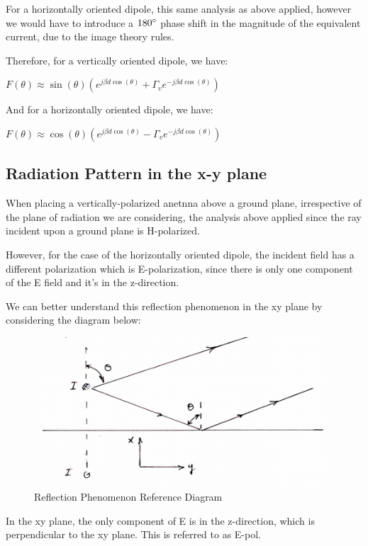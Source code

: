 \documentclass{article}
\begin{document}
For a horizontally oriented dipole, this same analysis as above applied, however we would have to introduce a $180 \degree$ phase shift in the magnitude of the equivalent current, due to the image theory rules.

Therefore, for a vertically oriented dipole, we have:

\begin{center}
    $F(\theta) \approx \sin(\theta)(e^{j\beta d \cos(\theta)} + \Gamma_v e^{-j \beta d \cos(\theta)})$
\end{center}

And for a horizontally oriented dipole, we have:

\begin{center}
    $F(\theta) \approx \cos(\theta)(e^{j\beta d \cos(\theta)} - \Gamma_v e^{-j \beta d \cos(\theta)})$
\end{center}

\subsection{Radiation Pattern in the x-y plane}

When placing a vertically-polarized anetnna above a ground plane, irrespective of the plane of radiation we are considering, the analysis above applied since the ray incident upon a ground plane is H-polarized.

However, for the case of the horizontally oriented dipole, the incident field has a different polarization which is E-polarization, since there is only one component of the E field and it's in the z-direction.

We can better understand this reflection phenomenon in the xy plane by considering the diagram below:

\begin{figure}[H]
  \centering
     \includegraphics[scale=0.45]{Course Notes/images/9.6.png}
  \caption{Reflection Phenomenon Reference Diagram}
\end{figure}

In the xy plane, the only component of E is in the z-direction, which is perpendicular to the xy plane. This is referred to as E-pol.
\end{document}
